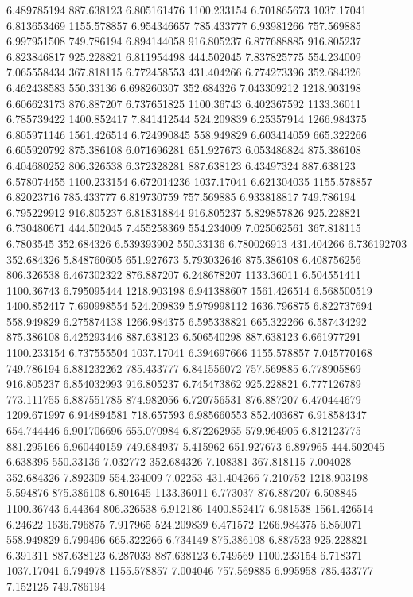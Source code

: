 6.489785194	887.638123
6.805161476	1100.233154
6.701865673	1037.17041
6.813653469	1155.578857
6.954346657	785.433777
6.93981266	757.569885
6.997951508	749.786194
6.894144058	916.805237
6.877688885	916.805237
6.823846817	925.228821
6.811954498	444.502045
7.837825775	554.234009
7.065558434	367.818115
6.772458553	431.404266
6.774273396	352.684326
6.462438583	550.33136
6.698260307	352.684326
7.043309212	1218.903198
6.606623173	876.887207
6.737651825	1100.36743
6.402367592	1133.36011
6.785739422	1400.852417
7.841412544	524.209839
6.25357914	1266.984375
6.805971146	1561.426514
6.724990845	558.949829
6.603414059	665.322266
6.605920792	875.386108
6.071696281	651.927673
6.053486824	875.386108
6.404680252	806.326538
6.372328281	887.638123
6.43497324	887.638123
6.578074455	1100.233154
6.672014236	1037.17041
6.621304035	1155.578857
6.82023716	785.433777
6.819730759	757.569885
6.933818817	749.786194
6.795229912	916.805237
6.818318844	916.805237
5.829857826	925.228821
6.730480671	444.502045
7.455258369	554.234009
7.025062561	367.818115
6.7803545	352.684326
6.539393902	550.33136
6.780026913	431.404266
6.736192703	352.684326
5.848760605	651.927673
5.793032646	875.386108
6.408756256	806.326538
6.467302322	876.887207
6.248678207	1133.36011
6.504551411	1100.36743
6.795095444	1218.903198
6.941388607	1561.426514
6.568500519	1400.852417
7.690998554	524.209839
5.979998112	1636.796875
6.822737694	558.949829
6.275874138	1266.984375
6.595338821	665.322266
6.587434292	875.386108
6.425293446	887.638123
6.506540298	887.638123
6.661977291	1100.233154
6.737555504	1037.17041
6.394697666	1155.578857
7.045770168	749.786194
6.881232262	785.433777
6.841556072	757.569885
6.778905869	916.805237
6.854032993	916.805237
6.745473862	925.228821
6.777126789	773.111755
6.887551785	874.982056
6.720756531	876.887207
6.470444679	1209.671997
6.914894581	718.657593
6.985660553	852.403687
6.918584347	654.744446
6.901706696	655.070984
6.872262955	579.964905
6.812123775	881.295166
6.960440159	749.684937
5.415962	651.927673
6.897965	444.502045
6.638395	550.33136
7.032772	352.684326
7.108381	367.818115
7.004028	352.684326
7.892309	554.234009
7.02253	431.404266
7.210752	1218.903198
5.594876	875.386108
6.801645	1133.36011
6.773037	876.887207
6.508845	1100.36743
6.44364	806.326538
6.912186	1400.852417
6.981538	1561.426514
6.24622	1636.796875
7.917965	524.209839
6.471572	1266.984375
6.850071	558.949829
6.799496	665.322266
6.734149	875.386108
6.887523	925.228821
6.391311	887.638123
6.287033	887.638123
6.749569	1100.233154
6.718371	1037.17041
6.794978	1155.578857
7.004046	757.569885
6.995958	785.433777
7.152125	749.786194
